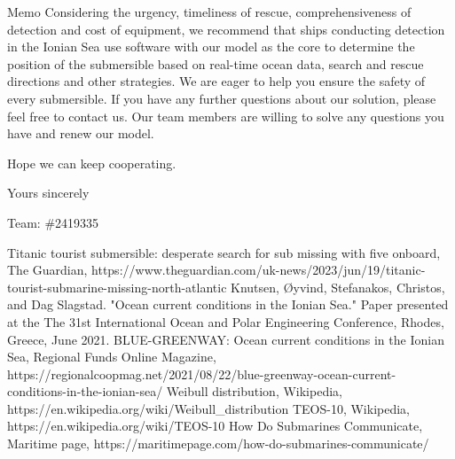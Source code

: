 \documentclass[12pt]{article}
\begin{document}
\begin{letter}{Memo}
Considering the urgency, timeliness of rescue, comprehensiveness of detection and cost of equipment, we recommend that ships conducting detection in the Ionian Sea use software with our model as the core to determine the position of the submersible based on real-time ocean data, search and rescue directions and other strategies. We are eager to help you ensure the safety of every submersible. If you have any further questions about our solution, please feel free to contact us. Our team members are willing to solve any questions you have and renew our model.

Hope we can keep cooperating.

\begin{flushright}
Yours sincerely

Team: \#2419335
\end{flushright}

\end{letter}

\clearpage
\begin{thebibliography}{99}
     Titanic tourist submersible: desperate search for sub missing with five onboard, The Guardian, https://www.theguardian.com/uk-news/2023/jun/19/titanic-tourist-submarine-missing-north-atlantic
     Knutsen, Øyvind, Stefanakos, Christos, and Dag Slagstad. "Ocean current conditions in the Ionian Sea." Paper presented at the The 31st International Ocean and Polar Engineering Conference, Rhodes, Greece, June 2021.
     BLUE-GREENWAY: Ocean current conditions in the Ionian Sea, Regional Funds Online Magazine, https://regionalcoopmag.net/2021/08/22/blue-greenway-ocean-current-conditions-in-the-ionian-sea/
     Weibull distribution, Wikipedia, https://en.wikipedia.org/wiki/Weibull\_distribution
     TEOS-10, Wikipedia, https://en.wikipedia.org/wiki/TEOS-10
     How Do Submarines Communicate, Maritime page, https://maritimepage.com/how-do-submarines-communicate/

\end{thebibliography}
\end{document}
